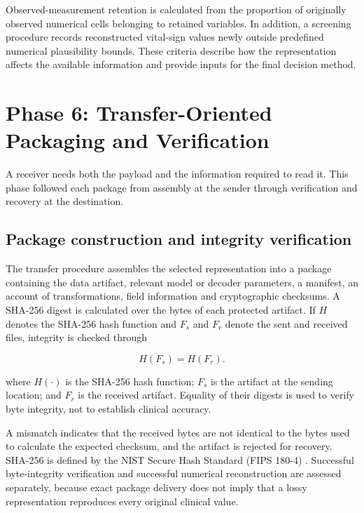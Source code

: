 \noindent Observed-measurement retention is calculated from the proportion of
originally observed numerical cells belonging to retained variables. In
addition, a screening procedure records reconstructed vital-sign values
newly outside predefined numerical plausibility bounds. These criteria
describe how the representation affects the available information and
provide inputs for the final decision method.

\section{Phase 6: Transfer-Oriented Packaging and Verification}\label{phase-6-transfer-oriented-packaging-and-verification}

\noindent A receiver needs both the payload and the information required to read it. This phase followed each package from assembly at the sender through verification and recovery at the destination.

\subsection{Package construction and integrity verification}\label{package-construction-and-integrity-verification}

The transfer procedure assembles the selected representation into a
package containing the data artifact, relevant model or decoder
parameters, a manifest, an account of transformations, field information
and cryptographic checksums. A SHA-256 digest is calculated over the
bytes of each protected artifact. If \(H\) denotes the SHA-256 hash
function and \(F_s\) and \(F_r\) denote the sent and received files,
integrity is checked through

\[
H(F_s)=H(F_r).\tag{3.9.1}
\]

\noindent where \(H(\cdot)\) is the SHA-256 hash function; \(F_s\) is the artifact
at the sending location; and \(F_r\) is the received artifact. Equality
of their digests is used to verify byte integrity, not to establish
clinical accuracy.

\noindent A mismatch indicates that the received bytes are not identical to the
bytes used to calculate the expected checksum, and the artifact is
rejected for recovery. SHA-256 is defined by the NIST Secure Hash
Standard (FIPS 180-4) \citep{NIST2015}. Successful byte-integrity verification and
successful numerical reconstruction are assessed separately, because
exact package delivery does not imply that a lossy representation
reproduces every original clinical value.

